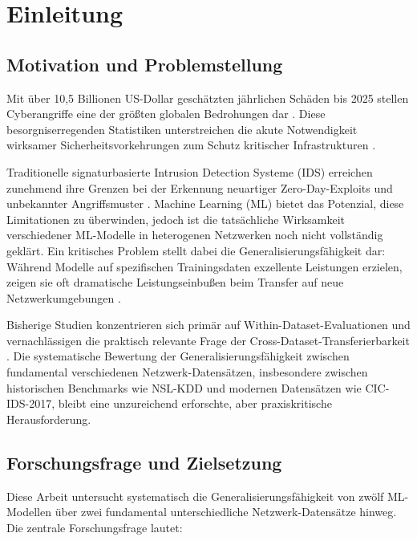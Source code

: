 \documentclass[11pt,a4paper]{article}
\begin{document}
    \setlength{\parindent}{0pt}

    \section{Einleitung}

    \subsection{Motivation und Problemstellung}

    Mit über 10,5 Billionen US-Dollar geschätzten jährlichen Schäden bis 2025 stellen Cyberangriffe eine der größten globalen Bedrohungen dar \parencite{GlobalRisksReport2024}. Diese besorgniserregenden Statistiken unterstreichen die akute Notwendigkeit wirksamer Sicherheitsvorkehrungen zum Schutz kritischer Infrastrukturen \parencite{Taman2024}.

    Traditionelle signaturbasierte Intrusion Detection Systeme (IDS) erreichen zunehmend ihre Grenzen bei der Erkennung neuartiger Zero-Day-Exploits und unbekannter Angriffsmuster \parencite{Ring2019,Belavagi2016}. Machine Learning (ML) bietet das Potenzial, diese Limitationen zu überwinden, jedoch ist die tatsächliche Wirksamkeit verschiedener ML-Modelle in heterogenen Netzwerken noch nicht vollständig geklärt. Ein kritisches Problem stellt dabei die Generalisierungsfähigkeit dar: Während Modelle auf spezifischen Trainingsdaten exzellente Leistungen erzielen, zeigen sie oft dramatische Leistungseinbußen beim Transfer auf neue Netzwerkumgebungen \parencite{Ring2019}.

    Bisherige Studien konzentrieren sich primär auf Within-Dataset-Evaluationen und vernachlässigen die praktisch relevante Frage der Cross-Dataset-Transferierbarkeit \parencite{Mourouzis2021}. Die systematische Bewertung der Generalisierungsfähigkeit zwischen fundamental verschiedenen Netzwerk-Datensätzen, insbesondere zwischen historischen Benchmarks wie NSL-KDD und modernen Datensätzen wie CIC-IDS-2017, bleibt eine unzureichend erforschte, aber praxiskritische Herausforderung.

    \subsection{Forschungsfrage und Zielsetzung}

    Diese Arbeit untersucht systematisch die Generalisierungsfähigkeit von zwölf ML-Modellen über zwei fundamental unterschiedliche Netzwerk-Datensätze hinweg. Die zentrale Forschungsfrage lautet:
\end{document}
